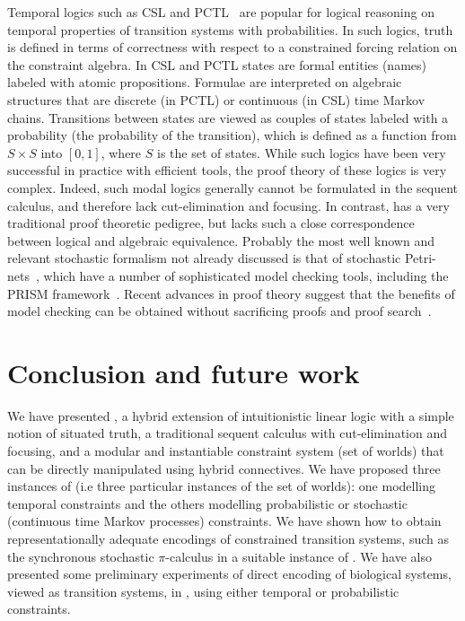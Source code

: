 \documentclass{article}
\begin{document}
Temporal logics such as CSL and PCTL~\cite{hansson94fac} are popular
for logical reasoning on temporal properties of transition systems with probabilities.
In such logics, truth is defined in terms of correctness with respect to a
constrained forcing relation on the constraint algebra.
In CSL and PCTL
states are formal entities (names) labeled with atomic propositions.
Formulae are interpreted on algebraic structures that are discrete (in PCTL)
or continuous (in CSL) time Markov chains.
Transitions between states are viewed as couples of states labeled with a probability
(the probability of the transition), which is defined as a function
from $S \times S$ into $[0,1]$, where $S$ is the set of states.
While such logics have been very successful in practice with
efficient tools, the proof theory of these logics is very complex. Indeed, such
modal logics generally cannot be formulated in the sequent calculus, and
therefore lack cut-elimination and focusing. In contrast, \hyll has a very
traditional proof theoretic pedigree, but lacks such a close correspondence
between logical and algebraic equivalence. Probably the most well known and
relevant stochastic formalism not already discussed is that of stochastic
Petri-nets~\cite{marsan95book}, which have a number of sophisticated model
checking tools, including the PRISM framework~\cite{kwiatkowska04sttt}. Recent
advances in proof theory suggest that the benefits of model checking can be
obtained without sacrificing proofs and proof search~\cite{baelde07cade}.

\section{Conclusion and future work}
\label{sec:concl}

We have presented \hyll, a hybrid extension of intuitionistic linear logic with
a simple notion of situated truth, a traditional sequent calculus with
cut-elimination and focusing, and a modular and instantiable constraint system
(set of worlds) that can be directly manipulated using hybrid connectives.
We have proposed three instances of \hyll
(i.e three particular instances of the set of worlds):
one modelling temporal constraints and the others modelling probabilistic
or stochastic (continuous time Markov processes) constraints.
We have shown how to obtain representationally adequate encodings of constrained
transition systems, such as the synchronous stochastic $\pi$-calculus in a suitable
instance of \hyll.
We have also presented some preliminary experiments of direct encoding of biological 
systems, viewed as transition systems, in \hyll, using either temporal or probabilistic 
constraints.
\end{document}

